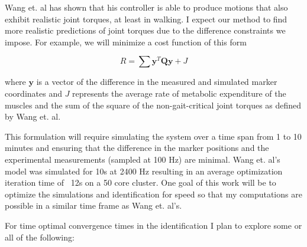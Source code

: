 \documentclass[11pt,twocolumn]{article}
\begin{document}
Wang et. al has shown that his controller is able to produce motions that also
exhibit realistic joint torques, at least in walking. I expect our method to
find more realistic predictions of joint torques due to the difference
constraints we impose. For example, we will minimize a cost function of this form

\begin{equation}
  R = \sum \mathbf{y}^T\mathbf{Q}\mathbf{y} + J
\end{equation}

where $\mathbf{y}$ is a vector of the difference in the measured and simulated
marker coordinates and $J$ represents the average rate of metabolic expenditure
of the muscles and the sum of the square of the non-gait-critical joint torques
as defined by Wang et. al.

This formulation will require simulating the system over a time span from 1 to
10 minutes and ensuring that the difference in the marker positions and the
experimental measurements (sampled at 100 Hz) are minimal. Wang et. al's model
was simulated for 10s at 2400 Hz resulting in an average optimization iteration
time of ~12s on a 50 core cluster. One goal of this work will be to optimize
the simulations and identification for speed so that my computations are
possible in a similar time frame as Wang et. al's.

For time optimal convergence times in the identification I plan to explore some
or all of the following:
\end{document}
